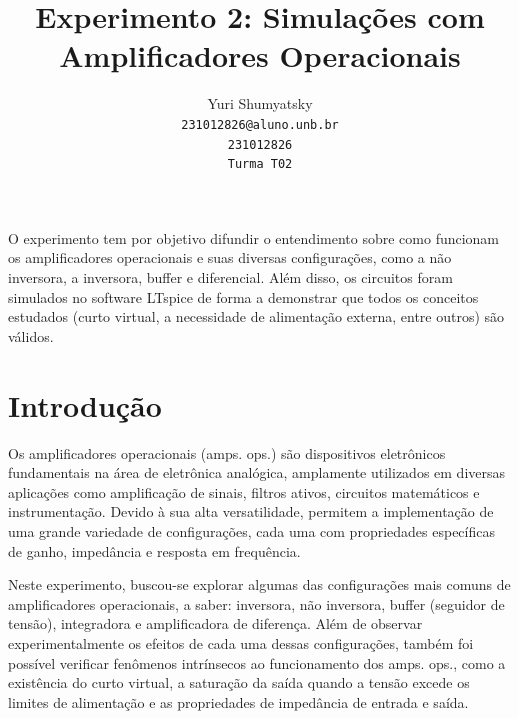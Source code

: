 \documentclass[10pt,twocolumn,letterpaper]{article}
\begin{document}
\title{Experimento 2: Simulações com Amplificadores Operacionais}

\author{Yuri Shumyatsky\\
{\tt\small 231012826@aluno.unb.br}\\
{\tt\small 231012826}\\
{\tt\small Turma T02}
}

\maketitle


\begin{objetivo}
O experimento tem por objetivo difundir o entendimento sobre como funcionam os amplificadores operacionais e suas diversas configurações, como a não inversora, a inversora, buffer e diferencial. Além disso, os circuitos foram simulados no software LTspice de forma a demonstrar que todos os conceitos estudados (curto virtual, a necessidade de alimentação externa, entre outros) são válidos. 

\end{objetivo}

\section{Introdução}

Os amplificadores operacionais (amps. ops.) são dispositivos eletrônicos fundamentais na área de eletrônica analógica, amplamente utilizados em diversas aplicações como amplificação de sinais, filtros ativos, circuitos matemáticos e instrumentação. Devido à sua alta versatilidade, permitem a implementação de uma grande variedade de configurações, cada uma com propriedades específicas de ganho, impedância e resposta em frequência.

Neste experimento, buscou-se explorar algumas das configurações mais comuns de amplificadores operacionais, a saber: inversora, não inversora, buffer (seguidor de tensão), integradora e amplificadora de diferença. Além de observar experimentalmente os efeitos de cada uma dessas configurações, também foi possível verificar fenômenos intrínsecos ao funcionamento dos amps. ops., como a existência do curto virtual, a saturação da saída quando a tensão excede os limites de alimentação e as propriedades de impedância de entrada e saída.
\end{document}
